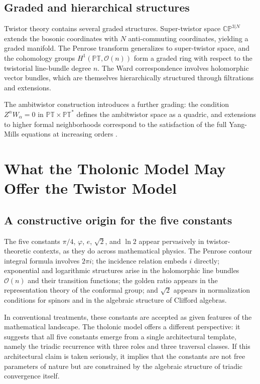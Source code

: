 \documentclass[12pt]{article}
\begin{document}
\subsection{Graded and hierarchical structures}\label{sec:graded}

Twistor theory contains several graded structures.  Super-twistor space
$\mathbb{CP}^{3|N}$ extends the bosonic coordinates with $N$ anti-commuting
coordinates, yielding a graded manifold.  The Penrose transform generalizes to
super-twistor space, and the cohomology groups $H^1(\mathbb{PT}, \mathcal{O}(n))$
form a graded ring with respect to the twistorial line-bundle degree $n$.  The Ward
correspondence involves holomorphic vector bundles, which are themselves hierarchically
structured through filtrations and extensions.

The ambitwistor construction introduces a further grading: the condition
$Z^\alpha W_\alpha = 0$ in $\mathbb{PT} \times \mathbb{PT}^*$ defines the ambitwistor
space as a quadric, and extensions to higher formal neighborhoods correspond to the
satisfaction of the full Yang-Mills equations at increasing orders
\cite[Theorem~7.1]{ADM17}.

\section{What the Tholonic Model May Offer the Twistor Model}\label{sec:tholonic-offers}

\subsection{A constructive origin for the five constants}\label{sec:constructive}

The five constants $\pi/4$, $\varphi$, $e$, $\sqrt{2}$, and $\ln 2$ appear pervasively
in twistor-theoretic contexts, as they do across mathematical physics.  The Penrose
contour integral formula involves $2\pi i$; the incidence relation embeds $i$ directly;
exponential and logarithmic structures arise in the holomorphic line bundles
$\mathcal{O}(n)$ and their transition functions; the golden ratio appears in the
representation theory of the conformal group; and $\sqrt{2}$ appears in normalization
conditions for spinors and in the algebraic structure of Clifford algebras.

In conventional treatments, these constants are accepted as given features of the
mathematical landscape.  The tholonic model offers a different perspective: it suggests
that all five constants emerge from a single architectural template, namely the triadic
recurrence with three roles and three traversal classes.  If this architectural claim is
taken seriously, it implies that the constants are not free parameters of nature but are
constrained by the algebraic structure of triadic convergence itself.
\end{document}
